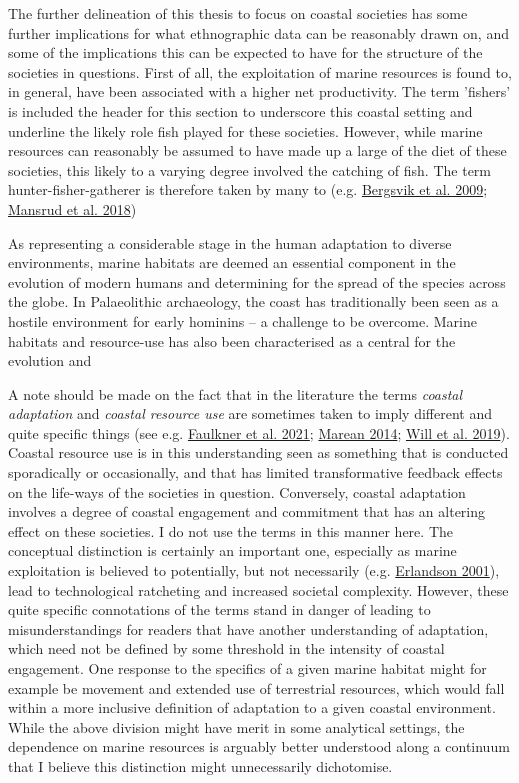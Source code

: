 \documentclass[
  a4paper,
  oneside]{uiophdthesis}
\begin{document}
The further delineation of this thesis to focus on coastal societies has some further implications for what ethnographic data can be reasonably drawn on, and some of the implications this can be expected to have for the structure of the societies in questions. First of all, the exploitation of marine resources is found to, in general, have been associated with a higher net productivity. The term 'fishers' is included the header for this section to underscore this coastal setting and underline the likely role fish played for these societies. However, while marine resources can reasonably be assumed to have made up a large of the diet of these societies, this likely to a varying degree involved the catching of fish. The term hunter-fisher-gatherer is therefore taken by many to (e.g. \protect\hyperlink{ref-bergsvik2009b}{Bergsvik et al. 2009}; \protect\hyperlink{ref-mansrud2018}{Mansrud et al. 2018})

As representing a considerable stage in the human adaptation to diverse environments, marine habitats are deemed an essential component in the evolution of modern humans and determining for the spread of the species across the globe. In Palaeolithic archaeology, the coast has traditionally been seen as a hostile environment for early hominins -- a challenge to be overcome. Marine habitats and resource-use has also been characterised as a central for the evolution and

A note should be made on the fact that in the literature the terms \emph{coastal adaptation} and \emph{coastal resource use} are sometimes taken to imply different and quite specific things (see e.g. \protect\hyperlink{ref-faulkner2021}{Faulkner et al. 2021}; \protect\hyperlink{ref-marean2014}{Marean 2014}; \protect\hyperlink{ref-will2019}{Will et al. 2019}). Coastal resource use is in this understanding seen as something that is conducted sporadically or occasionally, and that has limited transformative feedback effects on the life-ways of the societies in question. Conversely, coastal adaptation involves a degree of coastal engagement and commitment that has an altering effect on these societies. I do not use the terms in this manner here. The conceptual distinction is certainly an important one, especially as marine exploitation is believed to potentially, but not necessarily (e.g. \protect\hyperlink{ref-erlandson2001}{Erlandson 2001}), lead to technological ratcheting and increased societal complexity. However, these quite specific connotations of the terms stand in danger of leading to misunderstandings for readers that have another understanding of adaptation, which need not be defined by some threshold in the intensity of coastal engagement. One response to the specifics of a given marine habitat might for example be movement and extended use of terrestrial resources, which would fall within a more inclusive definition of adaptation to a given coastal environment. While the above division might have merit in some analytical settings, the dependence on marine resources is arguably better understood along a continuum that I believe this distinction might unnecessarily dichotomise.
\end{document}
